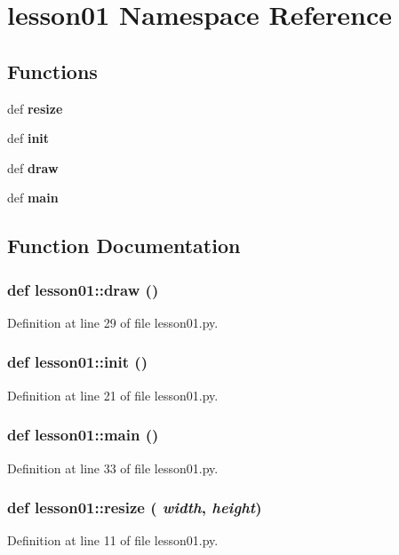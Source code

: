 \section{lesson01 Namespace Reference}
\label{namespacelesson01}


\subsection*{Functions}
\begin{CompactItemize}
\item 
def {\bf resize}
\item 
def {\bf init}
\item 
def {\bf draw}
\item 
def {\bf main}
\end{CompactItemize}


\subsection{Function Documentation}
\subsubsection{\setlength{\rightskip}{0pt plus 5cm}def lesson01::draw ()}\label{namespacelesson01_9ad36e3e23f8b742552d6d68ffd9cd64}




Definition at line 29 of file lesson01.py.
\subsubsection{\setlength{\rightskip}{0pt plus 5cm}def lesson01::init ()}\label{namespacelesson01_fa8ea646928f13f2ce9b400e51e519c9}




Definition at line 21 of file lesson01.py.
\subsubsection{\setlength{\rightskip}{0pt plus 5cm}def lesson01::main ()}\label{namespacelesson01_1b4c6bb9208c7abfa37d72601fa844a3}




Definition at line 33 of file lesson01.py.
\subsubsection{\setlength{\rightskip}{0pt plus 5cm}def lesson01::resize ( {\em width},  {\em height})}\label{namespacelesson01_4ba7e0ac4139180a8d0b8f51ede044ec}




Definition at line 11 of file lesson01.py.